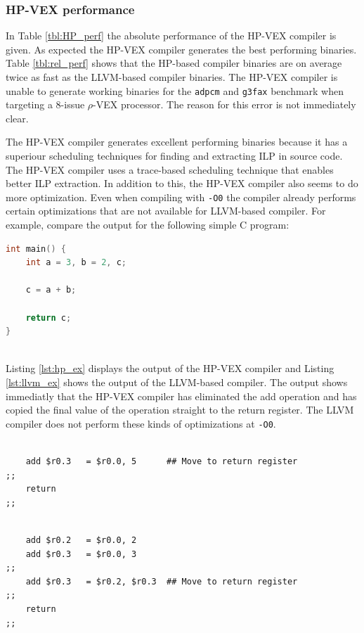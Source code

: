 \subsubsection{HP-VEX performance}
In Table \ref{tbl:HP_perf} the absolute performance of the HP-VEX compiler is given. As expected the HP-VEX compiler generates the best performing binaries. Table \ref{tbl:rel_perf} shows that the HP-based compiler binaries are on average twice as fast as the LLVM-based compiler binaries. The HP-VEX compiler is unable to generate working binaries for the \texttt{adpcm} and \texttt{g3fax} benchmark when targeting a 8-issue $\rho$-VEX processor. The reason for this error is not immediately clear.

The HP-VEX compiler generates excellent performing binaries because it has a superiour scheduling techniques for finding and extracting ILP in source code. The HP-VEX compiler uses a trace-based scheduling technique that enables better ILP extraction. In addition to this, the HP-VEX compiler also seems to do more optimization. Even when compiling with \texttt{-O0} the compiler already performs certain optimizations that are not available for LLVM-based compiler. For example, compare the output for the following simple C program:

\begin{lstlisting}[language=c]
int main() {
	int a = 3, b = 2, c;

	c = a + b;

	return c;
}
	
\end{lstlisting}

Listing \ref{lst:hp_ex} displays the output of the HP-VEX compiler and Listing \ref{lst:llvm_ex} shows the output of the LLVM-based compiler. The output shows immediatly that the HP-VEX compiler has eliminated the add operation and has copied the final value of the operation straight to the return register. The LLVM compiler does not perform these kinds of optimizations at \texttt{-O0}.

\begin{lstlisting}[language=rvex,label=lst:hp_ex, caption={HP compiler output}]

	add $r0.3   = $r0.0, 5  	## Move to return register
;;
	return
;;
\end{lstlisting}

\newpage

\begin{lstlisting}[language=rvex,label=lst:llvm_ex, caption={LLVM compiler output}]

	add $r0.2 	= $r0.0, 2
	add $r0.3 	= $r0.0, 3	
;;
	add $r0.3   = $r0.2, $r0.3  ## Move to return register
;;
	return
;;
\end{lstlisting}

